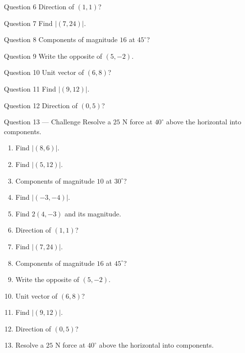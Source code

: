 \documentclass[11pt]{article}
\begin{document}
\begin{qbox}{Question 6}
Direction of $(1,1)$?\workspace{2.4cm}
\end{qbox}

\begin{qbox}{Question 7}
Find $|(7,24)|$.\workspace{2.4cm}
\end{qbox}

\begin{qbox}{Question 8}
Components of magnitude $16$ at $45^\circ$?\workspace{2.4cm}
\end{qbox}

\begin{qbox}{Question 9}
Write the opposite of $(5,-2)$.\workspace{2.4cm}
\end{qbox}

\begin{qbox}{Question 10}
Unit vector of $(6,8)$?\workspace{2.4cm}
\end{qbox}

\begin{qbox}{Question 11}
Find $|(9,12)|$.\workspace{2.4cm}
\end{qbox}

\begin{qbox}{Question 12}
Direction of $(0,5)$?\workspace{2.4cm}
\end{qbox}

\begin{qbox}{Question 13 --- Challenge}
Resolve a $25$ N force at $40^\circ$ above the horizontal into components.\workspace{3cm}
\end{qbox}

\clearpage
{}

\begin{recapbox}
\begin{multicols}{2}
\small
\begin{enumerate}[leftmargin=*,itemsep=3pt]
  \item Find $|(8,6)|$.
  \item Find $|(5,12)|$.
  \item Components of magnitude $10$ at $30^\circ$?
  \item Find $|(-3,-4)|$.
  \item Find $2(4,-3)$ and its magnitude.
  \item Direction of $(1,1)$?
  \item Find $|(7,24)|$.
  \item Components of magnitude $16$ at $45^\circ$?
  \item Write the opposite of $(5,-2)$.
  \item Unit vector of $(6,8)$?
  \item Find $|(9,12)|$.
  \item Direction of $(0,5)$?
  \item Resolve a $25$ N force at $40^\circ$ above the horizontal into components.
\end{enumerate}
\end{multicols}
\end{recapbox}
\end{document}

